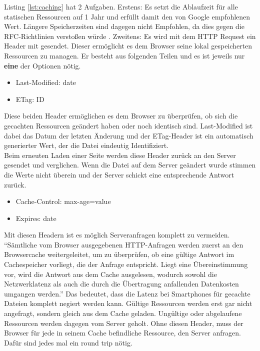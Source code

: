 		  Listing \ref{lst:caching} hat 2 Aufgaben. Erstens: Es setzt die Ablaufzeit für alle statischen Ressourcen auf 1 Jahr und erfüllt damit den von Google empfohlenen Wert. Längere Speicherzeiten sind dagegen nicht Empfohlen, da dies gegen die RFC-Richtlinien verstoßen würde \autocite{google14Caching}. Zweitens: Es wird mit dem HTTP Request ein Header mit gesendet. Dieser ermöglicht es dem Browser seine lokal gespeicherten Ressourcen zu managen. Er besteht aus folgenden Teilen und es ist jeweils nur \textbf{eine} der Optionen nötig.

		  \begin{itemize}
		  	\item Last-Modified: date
		  	\item ETag: ID
		  \end{itemize}

		  Diese beiden Header ermöglichen es dem Browser zu überprüfen, ob sich die gecachten Ressourcen geändert haben oder noch identisch sind. Last-Modified ist dabei das Datum der letzten Änderung und der ETag-Header ist ein automatisch generierter Wert, der die Datei eindeutig Identifiziert.\\
		  Beim erneuten Laden einer Seite werden diese Header zurück an den Server gesendet und verglichen. Wenn die Datei auf dem Server geändert wurde stimmen die Werte nicht überein und der Server schickt eine entsprechende Antwort zurück.

		  \begin{itemize}
		  	\item Cache-Control: max-age=value
		  	\item Expires: date
		  \end{itemize}

		  Mit diesen Headern ist es möglich Serveranfragen komplett zu vermeiden. "`Sämtliche vom Browser ausgegebenen HTTP-Anfragen werden zuerst an den Browsercache weitergeleitet, um zu überprüfen, ob eine gültige Antwort im Cachespeicher vorliegt, die der Anfrage entspricht. Liegt eine Übereinstimmung vor, wird die Antwort aus dem Cache ausgelesen, wodurch sowohl die Netzwerklatenz als auch die durch die Übertragung anfallenden Datenkosten umgangen werden."'\autocite{grigorikCaching} Das bedeutet, dass die Latenz bei Smartphones für gecachte Dateien komplett negiert werden kann. Gültige Ressourcen werden erst gar nicht angefragt, sondern gleich aus dem Cache geladen. Ungültige oder abgelaufene Ressourcen werden dagegen vom Server geholt. Ohne diesen Header, muss der Browser für jede in seinem Cache befindliche Ressource, den Server anfragen. Dafür sind jedes mal ein round trip nötig.\\


